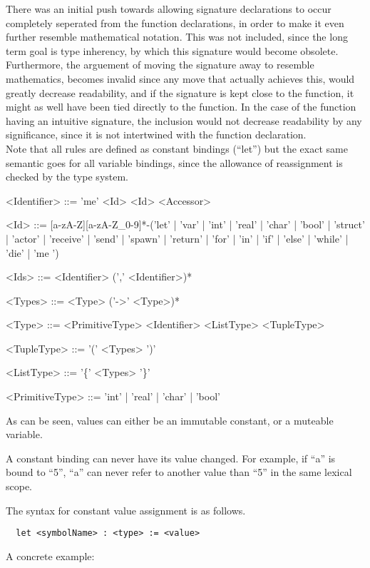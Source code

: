 There was an initial push towards allowing signature declarations to occur completely seperated from the function declarations, in order to make it even further resemble mathematical notation. This was not included, since the long term goal is type inherency, by which this signature would become obsolete. Furthermore, the arguement of moving the signature away to resemble mathematics, becomes invalid since any move that actually achieves this, would greatly decrease readability, and if the signature is kept close to the function, it might as well have been tied directly to the function. In the case of the function having an intuitive signature, the inclusion would not decrease readability by any significance, since it is not intertwined with the function declaration.\\

Note that all rules are defined as constant bindings (\enquote{let}) but the exact same semantic goes for all variable bindings, since the allowance of reassignment is checked by the type system.

\begin{grammar}
<Identifier> ::= 'me'
 \alt <Id>
 \alt <Id> <Accessor>

<Id> ::= [a-zA-Z][a-zA-Z\_0-9]*-('let' | 'var' | 'int' | 'real' | 'char' | 'bool' | 'struct' | 'actor' | 'receive' | 'send' | 'spawn' | 'return' | 'for' | 'in' | 'if' | 'else' | 'while' | 'die' | 'me ')

<Ids> ::= <Identifier> (',' <Identifier>)*

<Types> ::= <Type> ('->' <Type>)*

<Type> ::= <PrimitiveType>
 \alt <Identifier>
 \alt <ListType>
 \alt <TupleType>

<TupleType> ::= '(' <Types> ')'

<ListType> ::= '\{' <Types> '\}'

<PrimitiveType> ::= 'int' | 'real' | 'char' | 'bool'
\end{grammar}

As can be seen, values can either be an immutable constant, or a muteable variable.

A constant binding can never have its value changed. For example, if \enquote{a} is bound to \enquote{5}, \enquote{a} can never refer to another value than \enquote{5} in the same lexical scope. 

The syntax for constant value assignment is as follows.
\begin{verbatim}
  let <symbolName> : <type> := <value>
\end{verbatim}
A concrete example:

